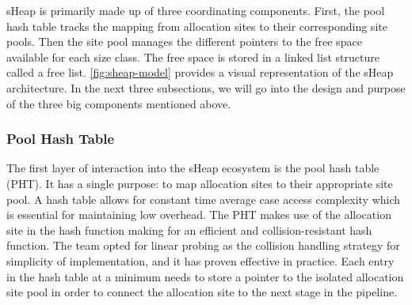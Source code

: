 \documentclass[conference]{IEEEtran}
\begin{document}
sHeap is primarily made up of three coordinating components. First, the 
pool hash table tracks the mapping from allocation sites to their 
corresponding site pools. Then the site pool manages the different pointers 
to the free space available for each size class. The free space is stored 
in a linked list structure called a free list. \ref{fig:sheap-model} 
provides a visual representation of the sHeap architecture. In the next 
three subsections, we will go into the design and purpose of the three 
big components mentioned above.

\subsubsection{Pool Hash Table}
The first layer of interaction into the sHeap ecosystem is the pool hash table 
(PHT). It has a single purpose: to map allocation sites to their appropriate 
site pool. A hash table allows for constant time average case access complexity 
which is essential for maintaining low overhead. The PHT makes use of the 
allocation site in the hash function making for an efficient and 
collision-resistant hash function. The team opted for linear probing as the 
collision handling strategy for simplicity of implementation, and it has proven 
effective in practice. Each entry in the hash table at a minimum needs to store 
a pointer to the isolated allocation site pool in order to connect the 
allocation site to the next stage in the pipeline.
\end{document}
